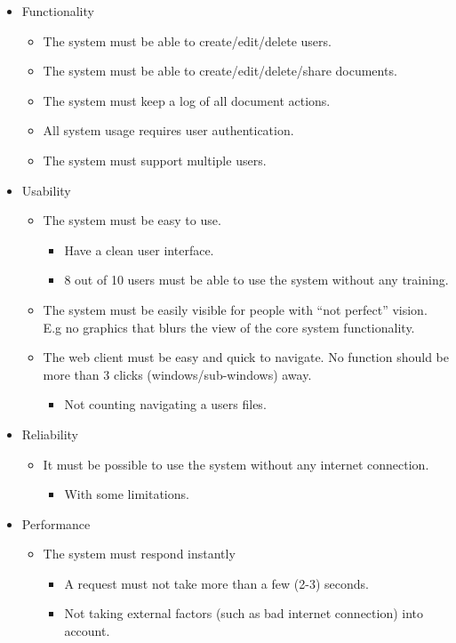 \documentclass[11pt]{article}
\begin{document}
\begin{itemize}
\item Functionality
\begin{itemize}
\item The system must be able to create/edit/delete users.
\item The system must be able to create/edit/delete/share documents.
\item The system must keep a log of all document actions.
\item All system usage requires user authentication.
\item The system must support multiple users.
\end{itemize}
\item Usability
\begin{itemize}
\item The system must be easy to use.
\begin{itemize}
\item Have a clean user interface.
\item 8 out of 10 users must be able to use the system without any training.
\end{itemize}
\item The system must be easily visible for people with ``not perfect'' vision. 
       E.g no graphics that blurs the view of the core system functionality.
\item The web client must be easy and quick to navigate. No function should 
       be more than 3 clicks (windows/sub-windows) away.
\begin{itemize}
\item Not counting navigating a users files.
\end{itemize}
\end{itemize}
\item Reliability
\begin{itemize}
\item It must be possible to use the system without any internet connection.
\begin{itemize}
\item With some limitations.
\end{itemize}
\end{itemize}
\item Performance
\begin{itemize}
\item The system must respond instantly
\begin{itemize}
\item A request must not take more than a few (2-3) seconds.
\item Not taking external factors (such as bad internet connection) into account.
\end{itemize}
\end{itemize}
\end{itemize}
\end{document}
